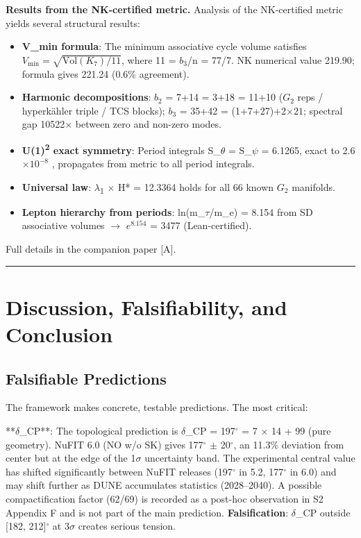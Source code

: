 \documentclass[11pt,a4paper]{article}
\begin{document}
\textbf{Results from the NK-certified metric.} Analysis of the
NK-certified metric yields several structural results:

\begin{itemize}

\item
  \textbf{V\_min formula}: The minimum associative cycle volume
  satisfies $V_{\min} = \sqrt{\mathrm{Vol}(K_7)/11}$, where 11 = \(b_{3}\)/n =
  77/7. NK numerical value 219.90; formula gives 221.24 (0.6\%
  agreement).
\item
  \textbf{Harmonic decompositions}: \(b_{2}\) = 7+14 = 3+18 = 11+10
  (\(G_{2}\) reps / hyperkähler triple / TCS blocks); \(b_{3}\) = 35+42
  = (1+7+27)+2\(\times 21\); spectral gap 10522\(\times\) between zero
  and non-zero modes.
\item
  \textbf{U(1)\textsuperscript{2} exact symmetry}: Period integrals
  S\_\(\theta\) = S\_\(\psi\) = 6.1265, exact to 2.6\(\times 10^{-8}\)
, propagates from metric to all period integrals.
\item
  \textbf{Universal law}: \(\lambda\)\textsubscript{1} \(\times\) H* =
  12.3364 holds for all 66 known \(G_{2}\) manifolds.
\item
  \textbf{Lepton hierarchy from periods}: ln(m\_\(\tau\)/m\_e) = 8.154
  from SD associative volumes \(\to\) \(e^{8.154}\) = 3477
  (Lean-certified).
\end{itemize}

Full details in the companion paper [A].

\noindent

\rule{\textwidth}{0.2pt}

\section{Discussion, Falsifiability, and Conclusion}

\subsection{Falsifiable Predictions}

The framework makes concrete, testable predictions. The most critical:

**\(\delta\)\_CP**: The topological prediction is \(\delta\)\_CP =
197\({}^{\circ}\) = 7 \(\times\) 14 + 99 (pure geometry). NuFIT 6.0 (NO
w/o SK) gives 177\({}^{\circ}\) \(\pm\) 20\({}^{\circ}\), an 11.3\%
deviation from center but at the edge of the 1\(\sigma\) uncertainty
band. The experimental central value has shifted significantly between
NuFIT releases (197\({}^{\circ}\) in 5.2, 177\({}^{\circ}\) in 6.0) and
may shift further as DUNE accumulates statistics (2028--2040). A possible compactification factor (62/69) is recorded as a post-hoc observation in S2 Appendix F and is not part of the main prediction. \textbf{Falsification}: \(\delta\)\_CP outside
{[}182, 212{]}\({}^{\circ}\) at 3\(\sigma\) creates serious tension.
\end{document}
